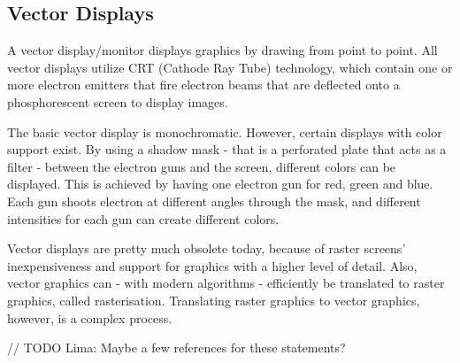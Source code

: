 \subsection{Vector Displays}
A vector display/monitor displays graphics by drawing from point to point. 
All vector displays utilize CRT (Cathode Ray Tube) technology, which contain one or more electron emitters that fire electron beams that are deflected onto a phosphorescent screen to display images.

The basic vector display is monochromatic. 
However, certain displays with color support exist. 
By using a shadow mask - that is a perforated plate that acts as a filter - between the electron guns and the screen, different colors can be displayed. This is achieved by having one electron gun for red, green and blue. Each gun shoots electron at different angles through the mask, and different intensities for each gun can create different colors.

Vector displays are pretty much obsolete today, because of raster screens' inexpensiveness and support for graphics with a higher level of detail. 
Also, vector graphics can - with modern algorithms - efficiently be translated to raster graphics, called rasterisation.
Translating raster graphics to vector graphics, however, is a complex process.

// TODO Lima: Maybe a few references for these statements?